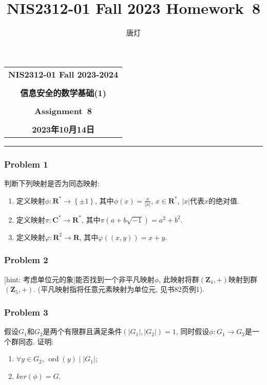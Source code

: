 \documentclass[a4paper,12pt]{ctexart}
\title{NIS2312-01 Fall 2023 Homework~8}
\author{唐灯}
\newcommand{\Z}{\mathbf{Z}}
\newcommand{\Com}{\mathbf{C}}
\newcommand{\ord}{\operatorname{ord}}
\newcommand{\R}{\mathbf{R}}
\begin{document}
  \begin{center}

  \vspace{-0.3in}
  \begin{tabular}{c}
    \textbf{\Large NIS2312-01 Fall 2023-2024} \\
    \textbf{\Large  } \\
    \textbf{\Large  信息安全的数学基础(1)} \\
    \textbf{\Large  } \\
    \textbf{\Large  Assignment~8} \\
    \textbf{\Large  } \\
    \textbf{\Large 2023年10月14日} \\
  \end{tabular}
  \end{center}
  \noindent
  \rule{\linewidth}{0.4pt}
  
\subsubsection*{Problem 1}
  判断下列映射是否为同态映射:
  \begin{enumerate}[label=(\arabic{*})]
    \item 定义映射$\phi:\R^*\rightarrow \left\{ \pm 1 \right\}$, 其中$\phi(x)=\frac{x}{|x|}$, $x\in \R^*$, $|x|$代表$x$的绝对值.
    \item 定义映射$\pi:\Com^*\rightarrow\R^*$, 其中$\pi(a+b\sqrt{-1})=a^2+b^2$.
    \item 定义映射$\varphi:\R^2\rightarrow\R$, 其中$\varphi((x,y))=x+y$.
  \end{enumerate}

\subsubsection*{Problem 2} 
  [hint: 考虑单位元的象]能否找到一个非平凡映射$\phi$, 此映射将群$(\Z_4,+)$映射到群$(\Z_5,+)$. 
  (平凡映射指将任意元素映射为单位元, 见书82页例1).
\subsubsection*{Problem 3} 
  假设$G_1$和$G_2$是两个有限群且满足条件$(|G_1|,|G_2|)=1$, 同时假设$\phi:G_1\rightarrow G_2$是一个群同态. 证明: 
  \begin{enumerate}[label=(\arabic{*})]
    \item $\forall y\in G_2$, $\ord(y)\mid |G_1|$;
    \item $ker(\phi)=G$.
  \end{enumerate}
\end{document}
